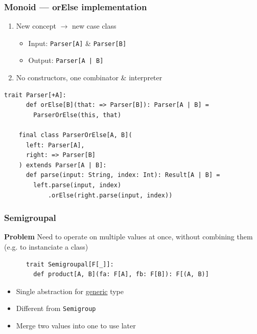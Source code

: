 \begin{frame}[fragile]
  \frametitle{Monoid --- orElse implementation}

  \begin{enumerate}
    \item New concept \({\rightarrow}\) new case class
          \begin{itemize}
            \item Input: \texttt{Parser[A]} \& \texttt{Parser[B]}
            \item Output: \texttt{Parser[A | B]}
          \end{itemize}
    \item No constructors, one combinator \& interpreter
  \end{enumerate}

  \begin{lstlisting}[gobble=4]
    trait Parser[+A]:
      def orElse[B](that: => Parser[B]): Parser[A | B] =
        ParserOrElse(this, that)

    final class ParserOrElse[A, B](
      left: Parser[A],
      right: => Parser[B]
    ) extends Parser[A | B]:
      def parse(input: String, index: Int): Result[A | B] =
        left.parse(input, index)
            .orElse(right.parse(input, index))
  \end{lstlisting}
\end{frame}

\begin{frame}[fragile]
  \frametitle{Semigroupal}

  \textbf{Problem} Need to operate on multiple values at once, without combining them (e.g. to instanciate a class)

  \begin{definition}[Semigroupal]
    \begin{lstlisting}
      trait Semigroupal[F[_]]:
        def product[A, B](fa: F[A], fb: F[B]): F[(A, B)]
    \end{lstlisting}
  \end{definition}

  \begin{itemize}
    \item Single abstraction for \ul{generic} type
    \item Different from \texttt{Semigroup}
    \item Merge two values into one to use later
  \end{itemize}
\end{frame}

